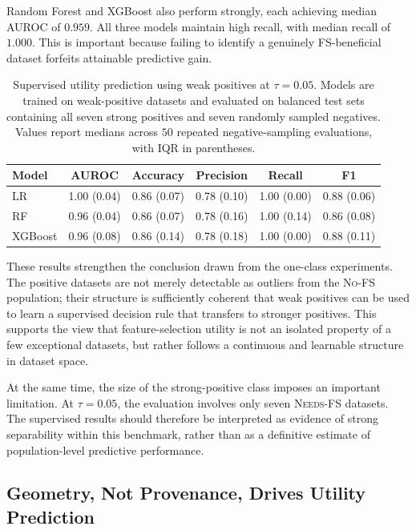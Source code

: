 \documentclass[preprint,12pt,authoryear]{elsarticle}
\begin{document}
Random Forest and XGBoost also perform strongly, each achieving median AUROC of $0.959$. All three models maintain high recall, with median recall of $1.000$. This is important because failing to identify a genuinely FS-beneficial dataset forfeits attainable predictive gain.

\begin{table}[htbp]
\centering
\footnotesize
\caption{Supervised utility prediction using weak positives at $\tau=0.05$. Models are trained on weak-positive datasets and evaluated on balanced test sets containing all seven strong positives and seven randomly sampled negatives. Values report medians across $50$ repeated negative-sampling evaluations, with IQR in parentheses.}
\label{tab:supervised_results}
\begin{tabular}{lccccc}
\toprule
Model & AUROC & Accuracy & Precision & Recall & F1 \\
\midrule
LR      & 1.00 (0.04) & 0.86 (0.07) & 0.78 (0.10) & 1.00 (0.00) & 0.88 (0.06) \\
RF      & 0.96 (0.04) & 0.86 (0.07) & 0.78 (0.16) & 1.00 (0.14) & 0.86 (0.08) \\
XGBoost & 0.96 (0.08) & 0.86 (0.14) & 0.78 (0.18) & 1.00 (0.00) & 0.88 (0.11) \\
\bottomrule
\end{tabular}
\end{table}
These results strengthen the conclusion drawn from the one-class experiments. The positive datasets are not merely detectable as outliers from the \textsc{No-FS} population; their structure is sufficiently coherent that weak positives can be used to learn a supervised decision rule that transfers to stronger positives. This supports the view that feature-selection utility is not an isolated property of a few exceptional datasets, but rather follows a continuous and learnable structure in dataset space.

At the same time, the size of the strong-positive class imposes an important limitation. At $\tau=0.05$, the evaluation involves only seven \textsc{Needs-FS} datasets. The supervised results should therefore be interpreted as evidence of strong separability within this benchmark, rather than as a definitive estimate of population-level predictive performance.

\subsection{Geometry, Not Provenance, Drives Utility Prediction}
\label{sec:results_ablation}
\end{document}
